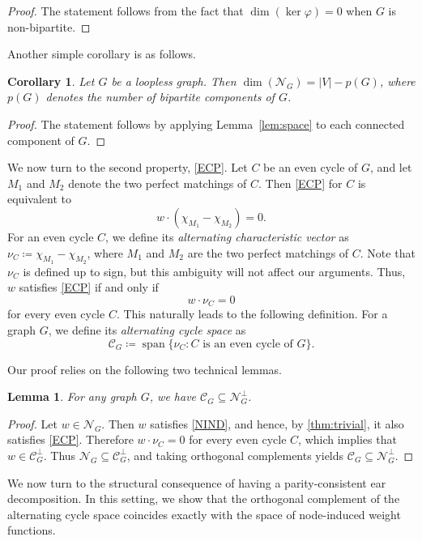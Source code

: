 \documentclass{article}
\theoremstyle{plain}
\newtheorem{lem}[thm]{Lemma}
\newtheorem{cor}[thm]{Corollary}
\theoremstyle{definition}
\DeclareMathOperator\spa{span}
\newcommand{\cC}{\mathcal{C}}
\newcommand{\cN}{\mathcal{N}}
\begin{document}
\begin{proof}
    The statement follows from the fact that $\dim (\ker \varphi) = 0$ when $G$ is non-bipartite. 
\end{proof}

Another simple corollary is as follows.

\begin{cor}\label{cor:jgnofg}
Let $G$ be a loopless graph. Then $\dim(\cN_G) = |V| - p(G)$, where $p(G)$ denotes the number of bipartite components of $G$.
\end{cor}

\begin{proof}
    The statement follows by applying Lemma~\ref{lem:space} to each connected component of $G$.
\end{proof}

We now turn to the second property, \ref{ECP}. Let $C$ be an even cycle of $G$, and let $M_1$ and $M_2$ denote the two perfect matchings of $C$. Then \ref{ECP} for $C$ is equivalent to
\[
w \cdot (\chi_{M_1} - \chi_{M_2}) = 0.
\]
For an even cycle $C$, we define its \emph{alternating characteristic vector} as $\nu_C \coloneqq \chi_{M_1} - \chi_{M_2}$, where $M_1$ and $M_2$ are the two perfect matchings of $C$. Note that $\nu_C$ is defined up to sign, but this ambiguity will not affect our arguments. Thus, $w$ satisfies \ref{ECP} if and only if
\[
    w \cdot \nu_C = 0 
\]
for every even cycle $C$. This naturally leads to the following definition. For a graph $G$, we define its \emph{alternating cycle space} as
\[
    \cC_G \coloneqq \spa\{\nu_C \colon C \text{ is an even cycle of } G\}.
\]

Our proof relies on the following two technical lemmas.

\begin{lem}\label{lem:C_subset_of_N_perp}
    For any graph $G$, we have $\cC_G \subseteq \cN_G^{\perp}$.
\end{lem}
\begin{proof}
    Let $w \in \cN_G$. Then $w$ satisfies \ref{NIND}, and hence, by \cref{thm:trivial}, it also satisfies \ref{ECP}. Therefore $w \cdot \nu_C = 0$ for every even cycle $C$, which implies that $w \in \cC_G^{\perp}$. Thus $\cN_G \subseteq \cC_G^{\perp}$, and taking orthogonal complements yields $\cC_G \subseteq \cN_G^{\perp}$.
\end{proof}

We now turn to the structural consequence of having a parity-consistent ear decomposition. In this setting, we show that the orthogonal complement of the alternating cycle space coincides exactly with the space of node-induced weight functions.
\end{document}
